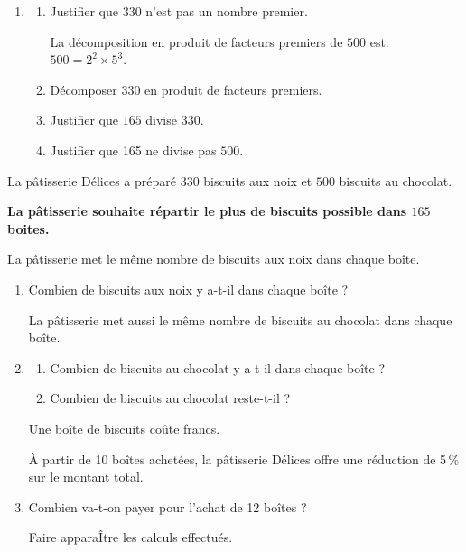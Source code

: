 \documentclass[exercice,a4]{thedocument}%
\begin{document}
%

\medskip

\begin{enumerate}
\item
	\begin{enumerate}
		\item Justifier que $330$ n'est pas un nombre premier.

La décomposition en produit de facteurs premiers de $500$ est: $500 = 2^2 \times 5^3$.
		\item Décomposer $330$ en produit de facteurs premiers.
		\item Justifier que $165$ divise $330$.
		\item Justifier que 165 ne divise pas $500$.
	\end{enumerate}
\end{enumerate}

La pâtisserie Délices a préparé $330$ biscuits aux noix et $500$ biscuits au chocolat.

\textbf{La pâtisserie souhaite répartir le plus de biscuits possible dans $165$ boites.}

La pâtisserie met le même nombre de biscuits aux noix dans chaque boîte.

\begin{enumerate}[resume]
\item Combien de biscuits aux noix y a-t-il dans chaque boîte ?

La pâtisserie met aussi le même nombre de biscuits au chocolat dans chaque boîte.
\item
	\begin{enumerate}
		\item Combien de biscuits au chocolat y a-t-il dans chaque boîte ?
		\item Combien de biscuits au chocolat reste-t-il ?
	\end{enumerate}

Une boîte de biscuits coûte  francs.

À partir de 10 boîtes achetées, la pâtisserie Délices offre une réduction de 5\,\% sur le montant total.
\item Combien va-t-on payer pour l'achat de 12 boîtes ?

Faire apparaÎtre les calculs effectués.

\end{enumerate}

\bigskip

\showthesource
\end{document}
